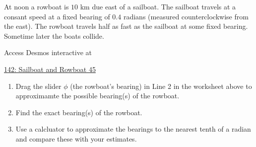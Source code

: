\documentclass{ximera}
\begin{document}
\begin{question}  \label{Q34dfefGfd}
At noon a rowboat is $10$ km due east of a sailboat. The sailboat travels at a consant speed at a fixed bearing of $0.4$ radians (measured counterclockwise from the east). The rowboat travels half as fast as the sailboat at some fixed bearing. Sometime later the boats collide.

 
\begin{onlineOnly}
    \begin{center}
\end{center}
\end{onlineOnly}

Access Desmos interactive at

\href{https://www.desmos.com/calculator/muqgmov9lu}{142: Sailboat and Rowboat 45}

\begin{enumerate}
\item Drag the slider $\phi$ (the rowboat's bearing) in Line 2 in the worksheet above to approximamte the possible bearing(s) of the rowboat.

\item Find the exact bearing(s) of the rowboat.

\item Use a calcluator to approximate the bearings to the nearest tenth of a radian and compare these with your estimates.



\end{enumerate}

\end{question}
\end{document}
